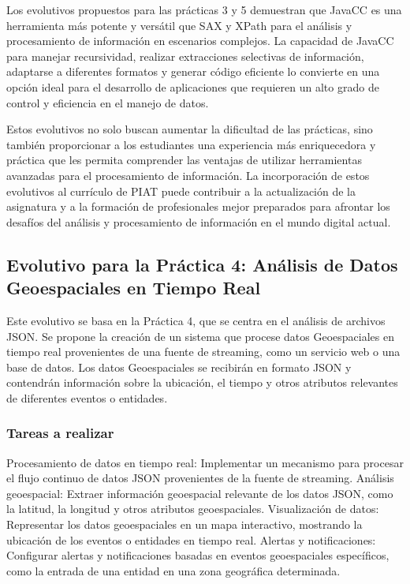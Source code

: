 
Los evolutivos propuestos para las prácticas 3 y 5 demuestran que JavaCC es una herramienta más potente y versátil que SAX y XPath para el análisis y procesamiento de información en escenarios complejos. La capacidad de JavaCC para manejar recursividad, realizar extracciones selectivas de información, adaptarse a diferentes formatos y generar código eficiente lo convierte en una opción ideal para el desarrollo de aplicaciones que requieren un alto grado de control y eficiencia en el manejo de datos.

Estos evolutivos no solo buscan aumentar la dificultad de las prácticas, sino también proporcionar a los estudiantes una experiencia más enriquecedora y práctica que les permita comprender las ventajas de utilizar herramientas avanzadas para el procesamiento de información. La incorporación de estos evolutivos al currículo de PIAT puede contribuir a la actualización de la asignatura y a la formación de profesionales mejor preparados para afrontar los desafíos del análisis y procesamiento de información en el mundo digital actual.


\subsection{Evolutivo para la Práctica 4: Análisis de Datos Geoespaciales en Tiempo Real}

Este evolutivo se basa en la Práctica 4, que se centra en el análisis de archivos JSON. Se propone la creación de un sistema que procese datos Geoespaciales en tiempo real provenientes de una fuente de streaming, como un servicio web o una base de datos. Los datos Geoespaciales se recibirán en formato JSON y contendrán información sobre la ubicación, el tiempo y otros atributos relevantes de diferentes eventos o entidades.

\subsubsection{Tareas a realizar}

Procesamiento de datos en tiempo real: Implementar un mecanismo para procesar el flujo continuo de datos JSON provenientes de la fuente de streaming.
Análisis geoespacial: Extraer información geoespacial relevante de los datos JSON, como la latitud, la longitud y otros atributos geoespaciales.
Visualización de datos: Representar los datos geoespaciales en un mapa interactivo, mostrando la ubicación de los eventos o entidades en tiempo real.
Alertas y notificaciones: Configurar alertas y notificaciones basadas en eventos geoespaciales específicos, como la entrada de una entidad en una zona geográfica determinada.
